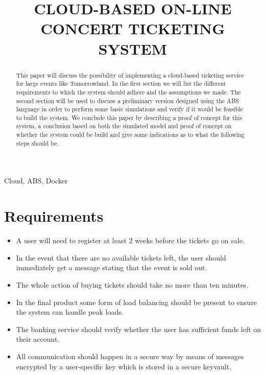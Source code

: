 \documentclass[conference]{IEEEtran}
\begin{document}
\title{CLOUD-BASED ON-LINE CONCERT TICKETING SYSTEM}

\author{
}

\maketitle

\begin{abstract}
This paper will discuss the possibility of implementing a cloud-based ticketing service for large events like Tomorrowland. In the first section we will list the different requirements to which the system should adhere and the assumptions we made. The second section will be used to discuss a preliminary version designed using the ABS language in order to perform some basic simulations and verify if it would be feasible to build the system. We conclude this paper by describing a proof of concept for this system, a conclusion based on both the simulated model and proof of concept on whether the system could be build and give some indications as to what the following steps should be.
\end{abstract}

\begin{IEEEkeywords}
Cloud, ABS, Docker
\end{IEEEkeywords}

\section*{Requirements}
\begin{itemize}
	\item A user will need to register at least 2 weeks before the tickets go on sale.
	\item In the event that there are no available tickets left, the user should immediately get a message stating that the event is sold out.
	\item The whole action of buying tickets should take no more than ten minutes.
	\item In the final product some form of load balancing should be present to ensure the system can handle peak loads.
	\item The banking service should verify whether the user has sufficient funds left on their account.
	\item All communication should happen in a secure way by means of messages encrypted by a user-specific key which is stored in a secure keyvault.
	\end{itemize}
\end{document}
